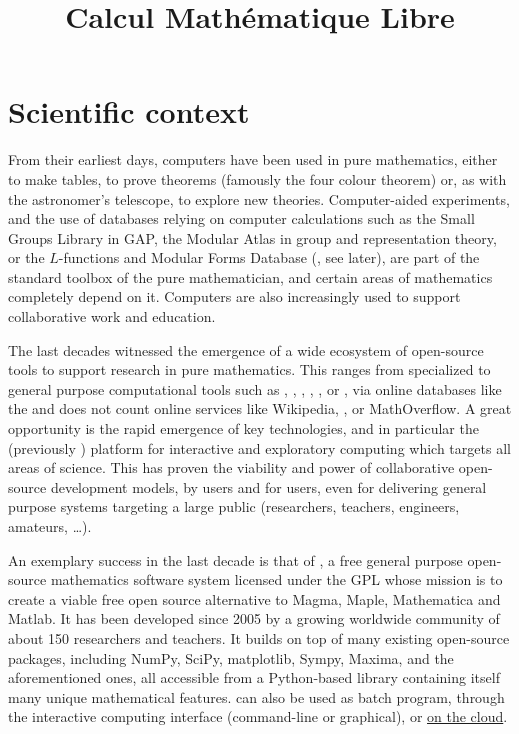 \documentclass[12pt]{amsbook}
\begin{document}
\title{Calcul Mathématique Libre}
\maketitle
\thispagestyle{empty}
\section{Scientific context}


From their earliest days, computers have been used in pure
mathematics, either to make tables, to prove theorems (famously the
four colour theorem) or, as with the astronomer's telescope, to
explore new theories. Computer-aided experiments, and the use of
databases relying on computer calculations such as the Small Groups
Library in GAP, the Modular Atlas in group and representation theory,
or the $L$-functions and Modular Forms Database (\LMFDB, see later),
are part of the standard toolbox of the pure mathematician, and
certain areas of mathematics completely depend on it. Computers are
also increasingly used to support collaborative work and education.

The last decades witnessed the emergence of a wide ecosystem of
open-source tools to support research in pure mathematics. This ranges
from specialized to general purpose computational tools such as \GAP,
\PariGP, \Linbox, \MPIR, \Sage, or \Singular, via online databases
like the \LMFDB and does not count online services like Wikipedia,
\Arxiv, or MathOverflow. A great opportunity is the rapid emergence of
key technologies, and in particular the \Jupyter (previously \IPython)
platform for interactive and exploratory computing which targets all
areas of science. This has proven the viability and power of
collaborative open-source development models, by users and for users,
even for delivering general purpose systems targeting a large public
(researchers, teachers, engineers, amateurs, \ldots).

An exemplary success in the last decade is that of \Sage,
a free general purpose open-source mathematics
software system licensed under the GPL whose mission is to create a
viable free open source alternative to Magma, Maple, Mathematica and
Matlab. It has been developed since 2005 by a growing worldwide community of
about 150 researchers and teachers. It builds on top of many existing
open-source packages, including NumPy, SciPy, matplotlib, Sympy,
Maxima, and the aforementioned ones, all accessible from a
Python-based library containing itself many unique mathematical
features. \Sage can also be used as batch program, through the
\Jupyter interactive computing interface (command-line or graphical),
or \href{cloud.sagemath.org}{on the cloud}.
\end{document}
